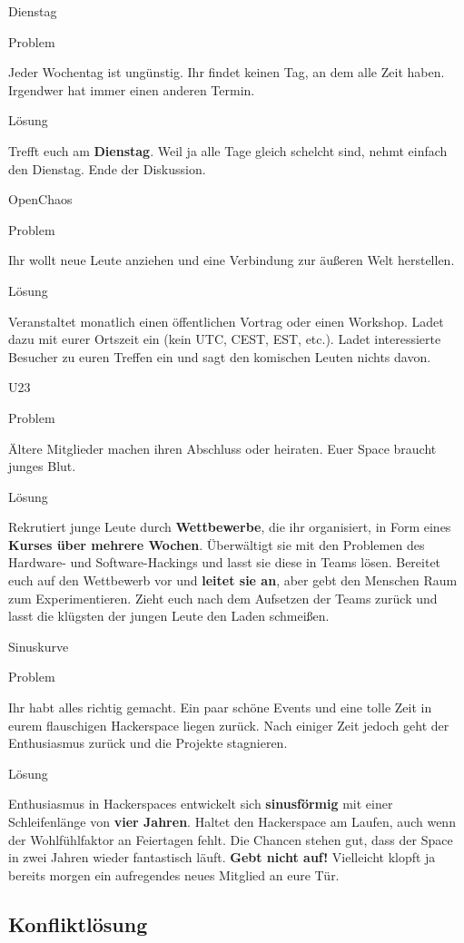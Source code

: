 \documentclass{beamer}
\newcommand{\pattern}[2]{
  \begin{alertblock}{Problem}
    #1
  \end{alertblock}
  \pause
  \begin{exampleblock}{Lösung}
    #2
  \end{exampleblock}
}
\begin{document}
  \begin{frame}{Dienstag}
    \pattern{
      Jeder Wochentag ist ungünstig. Ihr findet keinen Tag, an dem alle Zeit
      haben. Irgendwer hat immer einen anderen Termin.
    }{
      Trefft euch am \textbf{Dienstag}. Weil ja alle Tage gleich schelcht sind,
      nehmt einfach den Dienstag. Ende der Diskussion.
    }
  \end{frame}

  \begin{frame}{OpenChaos}
    \pattern{
      Ihr wollt neue Leute anziehen und eine Verbindung zur äußeren Welt herstellen.
    }{
      Veranstaltet monatlich einen öffentlichen Vortrag oder einen Workshop.
      Ladet dazu mit eurer Ortszeit ein (kein UTC, CEST, EST, etc.). Ladet
      interessierte Besucher zu euren Treffen ein und sagt den komischen Leuten
      nichts davon.
    }
  \end{frame}

  \begin{frame}{U23}
    \pattern{
      Ältere Mitglieder machen ihren Abschluss oder heiraten. Euer Space braucht junges Blut.
    }{
      Rekrutiert junge Leute durch \textbf{Wettbewerbe}, die ihr organisiert, in
      Form eines \textbf{Kurses über mehrere Wochen}. Überwältigt sie mit den
      Problemen des Hardware- und Software-Hackings und lasst sie diese in Teams
      lösen. Bereitet euch auf den Wettbewerb vor und \textbf{leitet sie an},
      aber gebt den Menschen Raum zum Experimentieren. Zieht euch nach dem
      Aufsetzen der Teams zurück und lasst die klügsten der jungen Leute den
      Laden schmeißen.
    }
  \end{frame}

  \begin{frame}{Sinuskurve}
    \pattern{
      Ihr habt alles richtig gemacht. Ein paar schöne Events und eine tolle
      Zeit in eurem flauschigen Hackerspace liegen zurück. Nach einiger Zeit
      jedoch geht der Enthusiasmus zurück und die Projekte stagnieren.
    }{
      Enthusiasmus in Hackerspaces entwickelt sich \textbf{sinusförmig} mit einer
      Schleifenlänge von \textbf{vier Jahren}. Haltet den Hackerspace am Laufen,
      auch wenn der Wohlfühlfaktor an Feiertagen fehlt. Die Chancen stehen gut,
      dass der Space in zwei Jahren wieder fantastisch läuft. \textbf{Gebt nicht
      auf!} Vielleicht klopft ja bereits morgen ein aufregendes neues Mitglied
      an eure Tür.
    }
  \end{frame}

  \subsection{Konfliktlösung}
\end{document}
